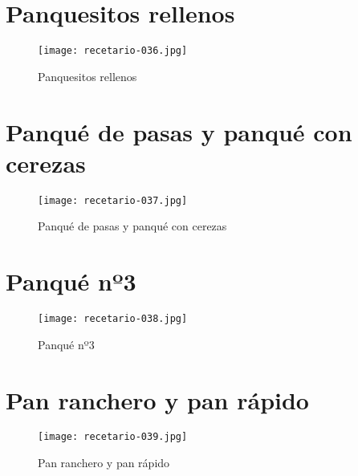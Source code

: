 \documentclass[12pt,letterpaper]{article}
\begin{document}
\newpage

  \section{Panquesitos rellenos}
  
    \begin{figure}[H]
      \vspace{2pt}
    \texttt{[image: recetario-036.jpg]}
      \caption{Panquesitos rellenos}
      
    \end{figure}

\newpage

\section{Panqué de pasas y panqué con cerezas}

  \begin{figure}[H]
    \vspace{2pt}
  \texttt{[image: recetario-037.jpg]}
    \caption{Panqué de pasas y panqué con cerezas}
    
  \end{figure}

\newpage

\section{Panqué nº3}

  \begin{figure}[H]
    \vspace{2pt}
  \texttt{[image: recetario-038.jpg]}
    \caption{Panqué nº3}
    
  \end{figure}

\newpage

\section{Pan ranchero y pan rápido}

  \begin{figure}[H]
    \vspace{2pt}
  \texttt{[image: recetario-039.jpg]}
    \caption{Pan ranchero y pan rápido}
    
  \end{figure}
\end{document}
